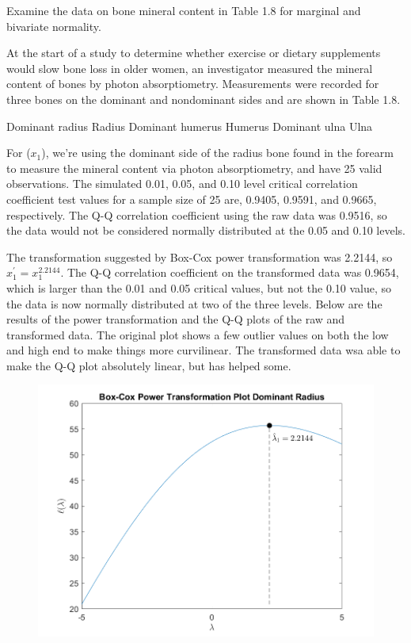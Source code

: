 Examine the data on bone mineral content in Table 1.8 for marginal and bivariate normality.

At the start of a study to determine whether exercise or dietary supplements would slow bone loss in older women, an investigator measured the mineral content of bones by photon absorptiometry.
Measurements were recorded for three bones on the dominant and nondominant sides and are shown in Table 1.8.

Dominant radius	Radius	Dominant humerus	Humerus	Dominant ulna	Ulna

For ($x_{1}$), we're using the dominant side of the radius bone found in the forearm to measure the mineral content via photon absorptiometry, and have 25 valid observations. The simulated 0.01, 0.05, and 0.10 level critical correlation coefficient test values for a sample size of 25 are, 0.9405, 0.9591, and 0.9665, respectively. The Q-Q correlation coefficient using the raw data was 0.9516, so the data would not be considered normally distributed at the 0.05 and 0.10 levels.

The transformation suggested by Box-Cox power transformation was 2.2144, so $x_{1}^{\prime} = x_{1}^{2.2144}$. The Q-Q correlation coefficient on the transformed data was 0.9654, which is larger than the 0.01 and 0.05 critical values, but not the 0.10 value, so the data is now normally distributed at two of the three levels. Below are the results of the power transformation and the Q-Q plots of the raw and transformed data. The original plot shows a few outlier values on both the low and high end to make things more curvilinear. The transformed data wsa able to make the Q-Q plot absolutely linear, but has helped some.

\begin{center}
    \begin{figure}[H]
        \centering
        \includegraphics[scale=0.6]{./matlab/chapter-4/sol4.34.power.1.png}
    \end{figure}
\end{center}

